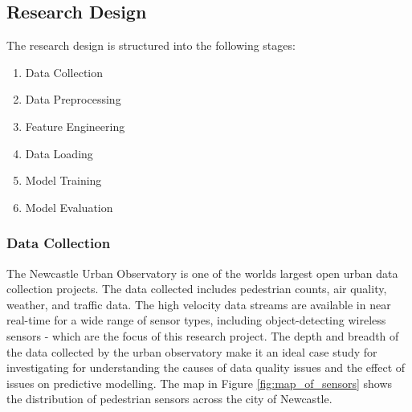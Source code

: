 \subsection{Research Design} \label{research_design}

The research design is structured into the following stages:

\begin{enumerate}
    \item Data Collection
    \item Data Preprocessing
    \item Feature Engineering
    \item Data Loading
    \item Model Training
    \item Model Evaluation
\end{enumerate}

\subsubsection{Data Collection}

The Newcastle Urban Observatory is one of the worlds largest open urban data collection projects. The data collected includes pedestrian counts, air quality, weather, and traffic data. The high velocity data streams are available in near real-time for a wide range of sensor types, including object-detecting wireless sensors - which are the focus of this research project. The depth and breadth of the data collected by the urban observatory make it an ideal case study for investigating for understanding the causes of data quality issues and the effect of issues on predictive modelling. The map in Figure \ref{fig:map_of_sensors} shows the distribution of pedestrian sensors across the city of Newcastle.

